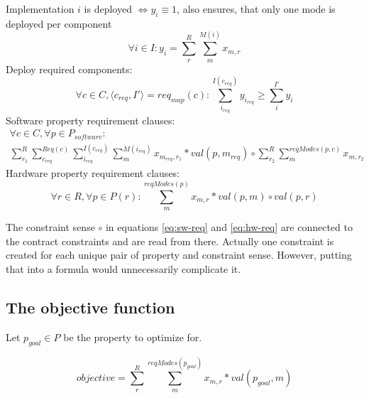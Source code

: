 \documentclass[10pt,a4paper]{article}
\begin{document}
Implementation $i$ is deployed $\Leftrightarrow y_i \equiv 1$, also ensures, that only one mode is deployed per component
\begin{equation}
	\forall i \in I: y_i = \sum_{r}^{R} \sum_{m}^{M(i)} x_{m,r} \label{eq:impl-shortcut}
\end{equation}
Deploy required components:
\begin{equation}
	\forall c \in C, \langle c_{req}, I' \rangle = req_{map}(c):
	\sum_{i_{req}}^{I(c_{req})} y_{i_{req}} \geq \sum_{i}^{I'} y_i
	\label{eq:req-comp}
\end{equation}
Software property requirement clauses:
\begin{multline}
	\forall c \in C, \forall p \in P_{software}: \\
	\sum_{r_1}^{R} \sum_{c_{req}}^{Req(c)} \sum_{i_{req}}^{I(c_{req})} \sum_m^{M(i_{req})} x_{m_{req},r_1} * val (p, m_{req}) \label{eq:sw-req} \circ \sum_{r_2}^{R} \sum_{m}^{reqModes(p,c)} x_{m,r_2}
\end{multline}
Hardware property requirement clauses:
\begin{equation}
	\forall r \in R, \forall p \in P(r): \sum_{m}^{reqModes(p)} x_{m,r} * val(p,m) \circ val(p,r) \label{eq:hw-req}
\end{equation}

The constraint sense $\circ$ in equations \eqref{eq:sw-req} and \eqref{eq:hw-req} are connected to the contract constraints and are read from there. Actually one constraint is created for each unique pair of property and constraint sense. However, putting that into a formula would unnecessarily complicate it.

\subsection{The objective function}

Let $p_{goal} \in P$ be the property to optimize for.

\begin{equation}
	objective = \sum_{r}^{R} \sum_{m}^{reqModes(p_{goal})} x_{m,r} * val(p_{goal},m)
\end{equation}
\end{document}
